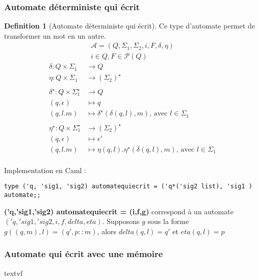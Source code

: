 \documentclass{article}
\theoremstyle{definition}
\newtheorem{definition}{Definition}[section]
\begin{document}
\subsubsection{Automate déterministe qui écrit}
\begin{definition}[Automate déterministe qui écrit]
Ce type d'automate permet de transformer un mot en un autre.\\
\begin{gather*}
    \mathcal{A} = (Q,\Sigma_1 ,\Sigma_2, i, F, \delta, \eta) \\
    i\in Q,F \in \mathcal{P} (Q)
\end{gather*}
\begin{align*} 
    \delta : Q\times \Sigma_1 &\rightarrow Q \\
    \eta : Q\times \Sigma_1 &\rightarrow (\Sigma_2 )^\star\\
    \\             
    \delta^\star : Q\times \Sigma_1 ^\star &\rightarrow Q \\
    (q,\epsilon) &\mapsto q\\
    (q,l.m) &\mapsto \delta^\star(\delta(q,l),m)\text{, avec }l\in \Sigma_1\\
    \\
    \eta^\star : Q\times \Sigma_1 ^\star &\rightarrow (\Sigma_2)^\star \\
    (q,\epsilon) &\mapsto \epsilon '\\
    (q,l.m) &\mapsto \eta(q,l).\eta^\star(\delta(q,l),m)\text{, avec }l\in \Sigma_1\\
\end{align*}

\end{definition}
Implementation en Caml : 
\begin{lstlisting}
type ('q, 'sig1, 'sig2) automatequiecrit = ('q*('sig2 list), 'sig1 ) automate;;
\end{lstlisting}
\textbf{('q,'sig1,'sig2) automatequiecrit = (i,f,g)} correspond \`a un automate $('q,'sig1,'sig2,i,f,delta,eta)$. Supposons $g$ sous la forme $g((q,m),l) = (q',p::m)$, alors $delta(q,l) = q'$ et $eta(q,l) = p$
\newpage
\subsubsection{Automate qui écrit avec une mémoire}

textvf
\end{document}
